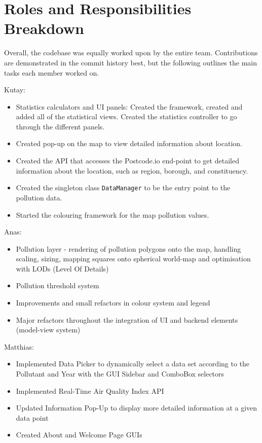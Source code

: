 \section{Roles and Responsibilities Breakdown}
Overall, the codebase was equally worked upon by the entire team. Contributions are demonstrated in the commit history best, but the following outlines the main tasks each member worked on.

Kutay:
\begin{itemize}
    \itemsep0em 
    \item Statistics calculators and UI panels: Created the framework, created and added all of the statistical views. Created the statistics controller to go through the different panels.
    \item Created pop-up on the map to view detailed information about location.
    \item Created the API that accesses the Postcode.io end-point to get detailed information about the location, such as region, borough, and constituency.
    \item Created the singleton class \verb|DataManager| to be the entry point to the pollution data.
    \item Started the colouring framework for the map pollution values.
\end{itemize}

Anas:
\begin{itemize}
    \itemsep0em 
    \item Pollution layer - rendering of pollution polygons onto the map, handling scaling, sizing, mapping squares onto spherical world-map and optimisation with LODs (Level Of Details)
    \item Pollution threshold system
    \item Improvements and small refactors in colour system and legend 
    \item Major refactors throughout the integration of UI and backend elements (model-view system)
\end{itemize}

Matthias:
\begin{itemize}
    \itemsep0em 
    \item Implemented Data Picker to dynamically select a data set according to the Pollutant and Year with the GUI Sidebar and ComboBox selectors
    \item Implemented Real-Time Air Quality Index API
    \item Updated Information Pop-Up to display more detailed information at a given data point
    \item Created About and Welcome Page GUIs 
\end{itemize}

